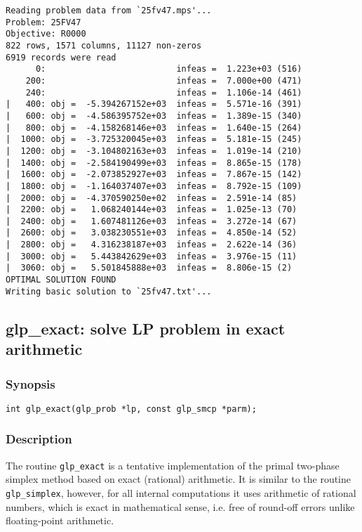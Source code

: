 \begin{footnotesize}
\begin{verbatim}
Reading problem data from `25fv47.mps'...
Problem: 25FV47
Objective: R0000
822 rows, 1571 columns, 11127 non-zeros
6919 records were read
      0:                          infeas =  1.223e+03 (516)
    200:                          infeas =  7.000e+00 (471)
    240:                          infeas =  1.106e-14 (461)
|   400: obj =  -5.394267152e+03  infeas =  5.571e-16 (391)
|   600: obj =  -4.586395752e+03  infeas =  1.389e-15 (340)
|   800: obj =  -4.158268146e+03  infeas =  1.640e-15 (264)
|  1000: obj =  -3.725320045e+03  infeas =  5.181e-15 (245)
|  1200: obj =  -3.104802163e+03  infeas =  1.019e-14 (210)
|  1400: obj =  -2.584190499e+03  infeas =  8.865e-15 (178)
|  1600: obj =  -2.073852927e+03  infeas =  7.867e-15 (142)
|  1800: obj =  -1.164037407e+03  infeas =  8.792e-15 (109)
|  2000: obj =  -4.370590250e+02  infeas =  2.591e-14 (85)
|  2200: obj =   1.068240144e+03  infeas =  1.025e-13 (70)
|  2400: obj =   1.607481126e+03  infeas =  3.272e-14 (67)
|  2600: obj =   3.038230551e+03  infeas =  4.850e-14 (52)
|  2800: obj =   4.316238187e+03  infeas =  2.622e-14 (36)
|  3000: obj =   5.443842629e+03  infeas =  3.976e-15 (11)
|  3060: obj =   5.501845888e+03  infeas =  8.806e-15 (2)
OPTIMAL SOLUTION FOUND
Writing basic solution to `25fv47.txt'...
\end{verbatim}
\end{footnotesize}

\subsection{glp\_exact: solve LP problem in exact arithmetic}

\subsubsection*{Synopsis}

\begin{verbatim}
int glp_exact(glp_prob *lp, const glp_smcp *parm);
\end{verbatim}

\subsubsection*{Description}

The routine \verb|glp_exact| is a tentative implementation of the
primal two-phase simplex method based on exact (rational) arithmetic.
It is similar to the routine \verb|glp_simplex|, however, for all
internal computations it uses arithmetic of rational numbers, which is
exact in mathematical sense, i.e. free of round-off errors unlike
floating-point arithmetic.

